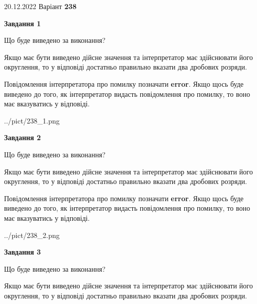 \documentclass[12pt, ukrainian]{article}
\begin{document}
{20.12.2022 Варіант \No \textbf { 238 }\par}
{
\begin {Large}

{\begin {center}\textbf{Завдання 1}\end {center}}\par
Що буде виведено за виконання? \par

Якщо має бути виведено дійсне значення та інтерпретатор має здійснювати його округлення, 
то у відповіді достатньо правильно вказати два дробових розряди.

Повідомлення інтерпретатора про помилку позначати \textbf{error}.
Якщо щось буде виведено до того, як інтерпретатор видасть повідомлення про помилку, 
то воно має вказуватись у відповіді. \par

\begin{center}
	{../pict/238_1.png}
\end{center}
\newpage

{\begin {center}\textbf{Завдання 2}\end {center}}\par
Що буде виведено за виконання? \par

Якщо має бути виведено дійсне значення та інтерпретатор має здійснювати його округлення, 
то у відповіді достатньо правильно вказати два дробових розряди.

Повідомлення інтерпретатора про помилку позначати \textbf{error}.
Якщо щось буде виведено до того, як інтерпретатор видасть повідомлення про помилку, 
то воно має вказуватись у відповіді. \par

\begin{center}
	{../pict/238_2.png}
\end{center}
\newpage

{\begin {center}\textbf{Завдання 3}\end {center}}\par
Що буде виведено за виконання? \par

Якщо має бути виведено дійсне значення та інтерпретатор має здійснювати його округлення, 
то у відповіді достатньо правильно вказати два дробових розряди.


\end{Large}}
\end{document}
